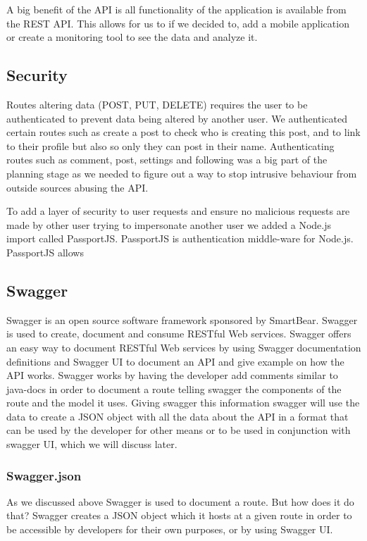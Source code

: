 A big benefit of the API is all functionality of the application is available from the REST API. This allows for us to if we decided to, add a mobile application or create a monitoring tool to see the data and analyze it.

\subsection{Security}
Routes altering data (POST, PUT, DELETE) requires the user to be authenticated to prevent data being altered by another user. We authenticated certain routes such as create a post to check who is creating this post, and to link to their profile but also so only they can post in their name. Authenticating routes such as comment, post, settings and following was a big part of the planning stage as we needed to figure out a way to stop intrusive behaviour from outside sources abusing the API.

To add a layer of security to user requests and ensure no malicious requests are made by other user trying to impersonate another user we added a Node.js import called PassportJS. PassportJS is authentication middle-ware for Node.js. PassportJS allows

\subsection{Swagger}
Swagger is an open source software framework sponsored by SmartBear. Swagger is used to create, document and consume  RESTful Web services. Swagger offers an easy way to document RESTful Web services by using Swagger documentation definitions and Swagger UI to document an API and give example on how the API works. Swagger works by having the developer add comments similar to java-docs in order to document a route telling swagger the components of the route and the model it uses. Giving swagger this information swagger will use the data to create a JSON object with all the data about the API in a format that can be used by the developer for other means or to be used in conjunction with swagger UI, which we will discuss later.

\subsubsection{Swagger.json}
As we discussed above Swagger is used to document a route. But how does it do that? Swagger creates a JSON object which it hosts at a given route in order to be accessible by developers for their own purposes, or by using Swagger UI.

